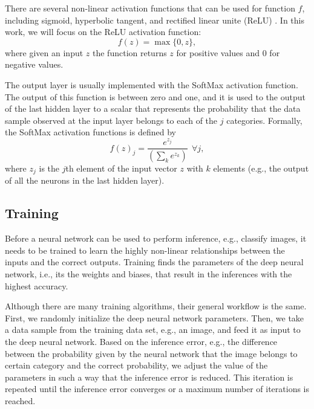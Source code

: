 \documentclass[conference]{IEEEtran}
\begin{document}
There are several non-linear activation functions that can be used for function $f$, including sigmoid,
hyperbolic tangent, and rectified linear unite (ReLU) \cite{Goodfellow-et-al-2016}. In this
work, we will focus on the ReLU activation function:
$$f(z) = \max\{0, z\},$$
where given an input $z$ the function returns $z$ for positive values and $0$ for negative values.

The output layer is usually implemented with the SoftMax activation function. The output of this function is between zero and
one, and it is used to the output of the last hidden layer to a scalar that represents the probability that the data sample observed at
the input layer belongs to each of the $j$ categories. Formally, the SoftMax activation functions is defined by
$$f(z)_j = \frac{e^{z_j}} {(\sum_ke^{z_k})} \ \  \forall j,$$
where $z_j$ is the $j$th element of the input vector $z$ with $k$ elements (e.g., the output of all the neurons in the last hidden
layer).

\subsection{Training}
Before a neural network can be used to perform inference, e.g., classify images, it needs to be trained to learn the highly non-linear relationships between the inputs and the correct outputs. Training finds the
parameters of the deep neural network, i.e., its the weights and biases, that result in the inferences with the highest accuracy.  

Although there are many training algorithms, their general workflow is the same. 
First, we randomly initialize the deep neural network parameters.
Then, we take a data sample from the training data set, e.g., an image, and feed it as input to the deep neural network. Based on the
inference error, e.g., the difference between the probability given by the neural network that the image belongs to certain category
and the correct probability, we adjust the value of the parameters in such a way that the inference error is reduced. This iteration is
repeated until the inference error converges or a maximum number of iterations is reached. 
\end{document}

